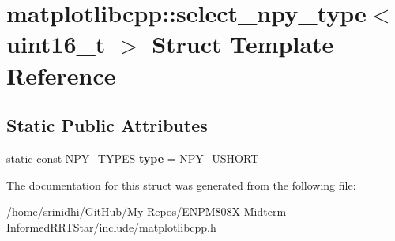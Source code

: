 \hypertarget{structmatplotlibcpp_1_1select__npy__type_3_01uint16__t_01_4}{}\section{matplotlibcpp\+:\+:select\+\_\+npy\+\_\+type$<$ uint16\+\_\+t $>$ Struct Template Reference}
\label{structmatplotlibcpp_1_1select__npy__type_3_01uint16__t_01_4}
\subsection*{Static Public Attributes}
\begin{DoxyCompactItemize}
\item 
static const N\+P\+Y\+\_\+\+T\+Y\+P\+ES {\bfseries type} = N\+P\+Y\+\_\+\+U\+S\+H\+O\+RT\hypertarget{structmatplotlibcpp_1_1select__npy__type_3_01uint16__t_01_4_aca209b33cc0bcaad16c01bff097a075f}{}\label{structmatplotlibcpp_1_1select__npy__type_3_01uint16__t_01_4_aca209b33cc0bcaad16c01bff097a075f}

\end{DoxyCompactItemize}


The documentation for this struct was generated from the following file\+:\begin{DoxyCompactItemize}
\item 
/home/srinidhi/\+Git\+Hub/\+My Repos/\+E\+N\+P\+M808\+X-\/\+Midterm-\/\+Informed\+R\+R\+T\+Star/include/matplotlibcpp.\+h\end{DoxyCompactItemize}
